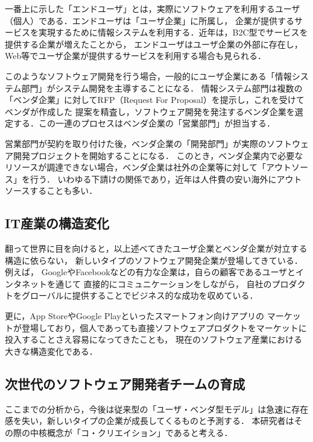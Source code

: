 \documentclass[a4j,9pt,twoside,twocolumn]{jsarticle}
\begin{document}
    一番上に示した「エンドユーザ」とは，実際にソフトウェアを利用するユーザ（個人）である．エンドユーザは「ユーザ企業」に所属し，
    企業が提供するサービスを実現するために情報システムを利用する．近年は，B2C型でサービスを提供する企業が増えたことから，
    エンドユーザはユーザ企業の外部に存在し，Web等でユーザ企業が提供するサービスを利用する場合も見られる．
    
    このようなソフトウェア開発を行う場合，一般的にユーザ企業にある「情報システム部門」がシステム開発を主導することになる．
    情報システム部門は複数の「ベンダ企業」に対してRFP（Request For Proposal）を提示し，これを受けてベンダが作成した
    提案を精査し，ソフトウェア開発を発注するベンダ企業を選定する．この一連のプロセスはベンダ企業の「営業部門」が担当する．
    
    営業部門が契約を取り付けた後，ベンダ企業の「開発部門」が実際のソフトウェア開発プロジェクトを開始することになる．
    このとき，ベンダ企業内で必要なリソースが調達できない場合，ベンダ企業は社外の企業等に対して「アウトソース」を行う．
    いわゆる下請けの関係であり，近年は人件費の安い海外にアウトソースすることも多い．
    
    \subsection{IT産業の構造変化}

    翻って世界に目を向けると，以上述べてきたユーザ企業とベンダ企業が対立する構造に依らない，
    新しいタイプのソフトウェア開発企業が登場してきている．例えば，
    GoogleやFacebookなどの有力な企業は，自らの顧客であるユーザとインタネットを通じて
    直接的にコミュニケーションをしながら，
    自社のプロダクトをグローバルに提供することでビジネス的な成功を収めている．
    
    更に，App StoreやGoogle Playといったスマートフォン向けアプリの
    マーケットが登場しており，個人であっても直接ソフトウェアプロダクトをマーケットに投入することさえ容易になってきたことも，
    現在のソフトウェア産業における大きな構造変化である．
    
	\subsection{次世代のソフトウェア開発者チームの育成}

    ここまでの分析から，今後は従来型の「ユーザ・ベンダ型モデル」は急速に存在感を失い，新しいタイプの企業が成長してくるものと予測する．
    本研究者はその際の中核概念が「コ・クリエイション」であると考える．
    
\end{document}
